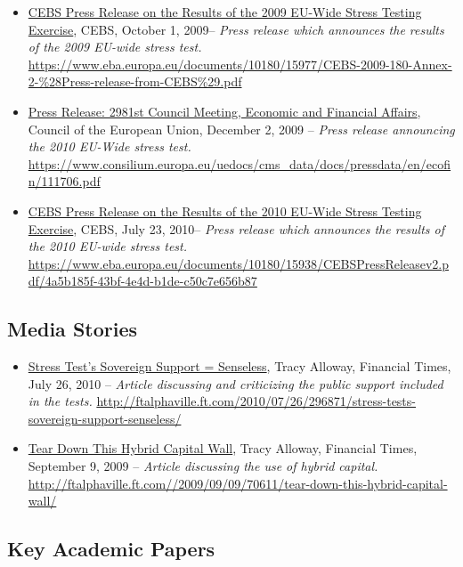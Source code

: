 \documentclass[12pt]{article}
\begin{document}
\begin{itemize}
\item
\ul{CEBS Press Release on the Results of the 2009 EU-Wide Stress Testing Exercise}, CEBS, October 1, 2009-- \emph{Press release which
 announces the results of the 2009 EU-wide stress test.} \url{https://www.eba.europa.eu/documents/10180/15977/CEBS-2009-180-Annex-2-\%28Press-release-from-CEBS\%29.pdf}
\item
\ul{Press Release: 2981st Council Meeting, Economic and Financial Affairs}, Council of the European Union, December 2, 2009 -- \emph{Press release
 announcing the 2010 EU-Wide stress test.} \url{https://www.consilium.europa.eu/uedocs/cms_data/docs/pressdata/en/ecofin/111706.pdf}
\item
\ul{CEBS Press Release on the Results of the 2010 EU-Wide Stress Testing Exercise}, CEBS, July 23, 2010-- \emph{Press release which
 announces the results of the 2010 EU-wide stress test.} \url{https://www.eba.europa.eu/documents/10180/15938/CEBSPressReleasev2.pdf/4a5b185f-43bf-4e4d-b1de-c50c7e656b87}
\end{itemize}

\subsection{Media Stories}

\begin{itemize}
\item
\ul{Stress Test's Sovereign Support = Senseless}, Tracy Alloway, Financial Times, July 26,
 2010 -- \emph{Article discussing and criticizing the public support included in the tests.} \url{http://ftalphaville.ft.com/2010/07/26/296871/stress-tests-sovereign-support-senseless/}
\item
\ul{Tear Down This Hybrid Capital Wall}, Tracy Alloway, Financial Times, September 9, 2009 -- \emph{Article discussing the use of hybrid capital.} \url{http://ftalphaville.ft.com//2009/09/09/70611/tear-down-this-hybrid-capital-wall/}

\end{itemize}

\subsection{Key Academic Papers}
\end{document}
